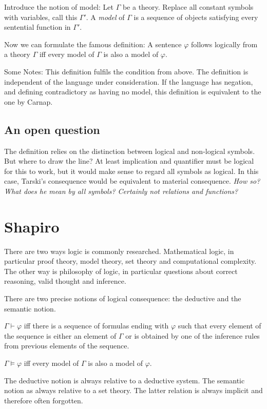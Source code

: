 \documentclass[a4paper]{article}
\begin{document}
Introduce the notion of model:  Let $\Gamma$ be a theory. Replace all constant
symbols with variables, call this $\Gamma'$.  A \emph{model} of $\Gamma$ is a
sequence of objects satisfying every sentential function in $\Gamma'$.

Now we can formulate the famous definition: A sentence $\varphi$ follows
logically from a theory $\Gamma$ iff every model of $\Gamma$ is also a model of
$\varphi$.

Some Notes: This definition fulfils the condition from above.  The definition is
independent of the language under consideration.  If the language has negation,
and defining contradictory as having no model, this definition is equivalent to
the one by Carnap.

\subsection{An open question}

The definition relies on the distinction between logical and non-logical
symbols.  But where to draw the line?  At least implication and quantifier must
be logical for this to work, but it would make sense to regard all symbols as
logical.  In this case, Tarski's consequence would be equivalent to material
consequence.  \emph{How so? What does he mean by \emph{all symbols}? Certainly
not relations and functions?}

\section{Shapiro}

There are two ways logic is commonly researched.  Mathematical logic, in
particular proof theory, model theory, set theory and computational complexity.
The other way is philosophy of logic, in particular questions about correct
reasoning, valid thought and inference.

There are two precise notions of logical consequence: the deductive and the
semantic notion.

$\Gamma \vdash \varphi$ iff there is a sequence of formulas ending with
$\varphi$ such that every element of the sequence is either an element of
$\Gamma$ or is obtained by one of the inference rules from previous elements of
the sequence.

$\Gamma \models \varphi$ iff every model of $\Gamma$ is also a model of
$\varphi$.

The deductive notion is always relative to a deductive system.  The semantic
notion as always relative to a set theory.  The latter relation is always
implicit and therefore often forgotten.
\end{document}

